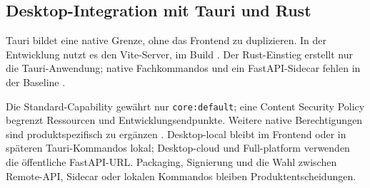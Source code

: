 \subsection{Desktop-Integration mit Tauri und Rust}
\label{subsec:tauri-rust-desktop}

Tauri bildet eine native Grenze, ohne das Frontend zu duplizieren. In der
Entwicklung nutzt es den Vite-Server, im Build . Der
Rust-Einstieg erstellt nur die Tauri-Anwendung; native Fachkommandos und ein
FastAPI-Sidecar fehlen in der Baseline
\parencite{tauri2026start,rust2026book,kleiveist2026architecture}.

Die Standard-Capability gewährt nur \texttt{core:default}; eine Content
Security Policy begrenzt Ressourcen und Entwicklungsendpunkte. Weitere native
Berechtigungen sind produktspezifisch zu ergänzen
\parencite{tauri2026capabilities}. Desktop-local bleibt im Frontend oder in
späteren Tauri-Kommandos lokal; Desktop-cloud und Full-platform verwenden die
öffentliche FastAPI-URL. Packaging, Signierung und die Wahl zwischen Remote-API,
Sidecar oder lokalen Kommandos bleiben Produktentscheidungen.
